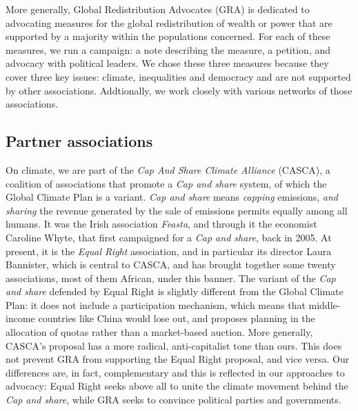 \documentclass[a5paper,english,openany]{memoir}
\begin{document}
More generally, Global Redistribution Advocates (GRA) is dedicated to advocating measures for the global redistribution of wealth or power that are supported by a majority within the populations concerned. For each of these measures, we run %
a campaign: a note describing the measure, a petition, and advocacy with political leaders. We chose these three measures because they cover three key issues: climate, inequalities and democracy %
and are not supported by other associations. Addtionally, %
we work closely with various networks of those %
associations. 

\subsection{Partner associations}

On climate, we are part of the \textit{Cap And Share Climate Alliance} (CASCA), a coalition of associations that promote %
a \textit{Cap and share} system, of which the Global Climate Plan is a variant. \textit{Cap and share} means \textit{capping} emissions, \textit{and sharing} the revenue generated by the sale of emissions permits equally among all humans. It was the Irish association \textit{Feasta}, and through it the economist Caroline Whyte, %
that first campaigned for a \textit{Cap and share}, back in 2005. At present, it is the \textit{Equal Right} association, and in particular its director Laura Bannister, %
which is central to CASCA, and has brought together some twenty associations, most of them African, %
under this banner. The variant of the \textit{Cap and share} defended by Equal Right is slightly different from the Global Climate Plan: it does not include a participation mechanism, which means that middle-income countries like China would lose out, %
and proposes planning in the allocation of quotas rather than a market-based auction. More generally, CASCA's proposal has a more radical, anti-capitalist tone than ours. This does not prevent GRA from supporting the Equal Right proposal, and vice versa. Our differences are, in fact, complementary %
and this is reflected in our approaches to advocacy: Equal Right seeks above all to unite the climate movement behind the \textit{Cap and share}, while GRA seeks to convince political parties and governments. 
\end{document}
